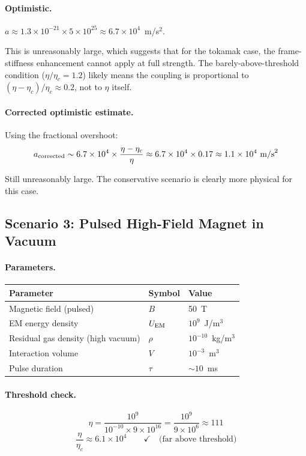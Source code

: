 \documentclass[12pt,a4paper]{article}
\begin{document}
\paragraph{Optimistic.}
$a \approx 1.3 \times 10^{-21} \times 5 \times 10^{25} \approx 6.7 \times 10^4$~m/s$^2$.

This is unreasonably large, which suggests that for the tokamak case, the
frame-stiffness enhancement cannot apply at full strength.  The barely-above-threshold
condition ($\eta/\eta_c = 1.2$) likely means the coupling is proportional to
$(\eta - \eta_c)/\eta_c \approx 0.2$, not to $\eta$ itself.

\paragraph{Corrected optimistic estimate.}
Using the fractional overshoot:
\begin{equation}
a_{\rm corrected} \sim 6.7 \times 10^4 \times \frac{\eta - \eta_c}{\eta}
\approx 6.7 \times 10^4 \times 0.17 \approx 1.1 \times 10^4~\text{m/s}^2
\end{equation}

Still unreasonably large.  The conservative scenario is clearly more physical for
this case.

\subsection{Scenario 3: Pulsed High-Field Magnet in Vacuum}

\paragraph{Parameters.}
\begin{center}
\begin{tabular}{lll}
\toprule
Parameter & Symbol & Value \\
\midrule
Magnetic field (pulsed) & $B$ & 50~T \\
EM energy density & $U_{\rm EM}$ & $10^9$~J/m$^3$ \\
Residual gas density (high vacuum) & $\rho$ & $10^{-10}$~kg/m$^3$ \\
Interaction volume & $V$ & $10^{-3}$~m$^3$ \\
Pulse duration & $\tau$ & $\sim 10$~ms \\
\bottomrule
\end{tabular}
\end{center}

\paragraph{Threshold check.}
\begin{equation}
\eta = \frac{10^9}{10^{-10} \times 9 \times 10^{16}} = \frac{10^9}{9 \times 10^6} \approx 111
\end{equation}
\begin{equation}
\frac{\eta}{\eta_c} \approx 6.1 \times 10^4
\qquad \checkmark \quad \text{(far above threshold)}
\end{equation}
\end{document}
